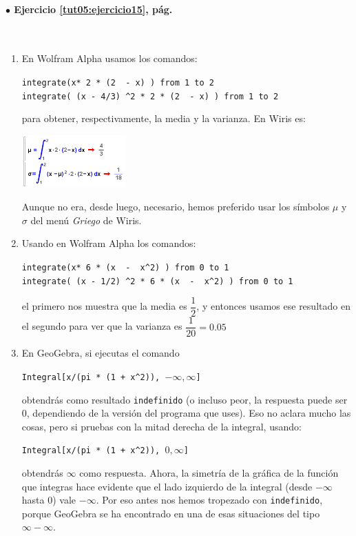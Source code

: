 \documentclass[10pt,a4paper]{article}\usepackage[]{graphicx}\usepackage[]{color}
\newcounter{cont01}
\begin{document}
\paragraph{\bf $\bullet$ Ejercicio \ref{tut05:ejercicio15}, pág. \pageref{tut05:ejercicio15}}
\label{tut05:ejercicio15:sol}\quad\\


\begin{enumerate}
  \item En Wolfram Alpha usamos los comandos:
    \begin{center}
        \verb#integrate(x* 2 * (2  - x) ) from 1 to 2#\\[3mm]
        \verb#integrate( (x - 4/3) ^2 * 2 * (2  - x) ) from 1 to 2#
    \end{center}
    para obtener, respectivamente, la media y la varianza. En Wiris es:
    \begin{center}
        \includegraphics[width=4cm]{../fig/Tut05-56.png}
    \end{center}
    Aunque no era, desde luego, necesario, hemos preferido usar los símbolos $\mu$ y $\sigma$ del menú {\em Griego} de Wiris.

  \item Usando en Wolfram Alpha los comandos:
    \begin{center}
        \verb#integrate(x* 6 * (x  -  x^2) ) from 0 to 1#\\[3mm]
        \verb#integrate( (x - 1/2) ^2 * 6 * (x  -  x^2) ) from 0 to 1#
    \end{center}
    el primero nos muestra que la media es $\dfrac{1}{2}$, y entonces usamos ese resultado en el segundo para ver que la varianza es $\dfrac{1}{20}=0.05$

  \item En GeoGebra, si ejecutas el comando
  \begin{center}
    \verb#Integral[x/(pi * (1 + x^2)), #$-\infty, \infty$\verb#]#
  \end{center}
  obtendrás como resultado {\tt indefinido} (o incluso peor, la respuesta puede ser $0$, dependiendo de la versión del programa que uses). Eso no aclara mucho las cosas, pero si pruebas con la mitad derecha de la integral, usando:
  \begin{center}
    \verb#Integral[x/(pi * (1 + x^2)), #$0, \infty$\verb#]#
  \end{center}
   obtendrás $\infty$ como respuesta. Ahora, la simetría de la gráfica de la función que integras hace evidente que el lado izquierdo de la integral (desde $-\infty$ hasta $0$) vale $-\infty$. Por eso antes nos hemos tropezado con {\tt indefinido}, porque GeoGebra se ha encontrado en una de esas situaciones del tipo $\infty - \infty$.


\end{enumerate}
\end{document}
